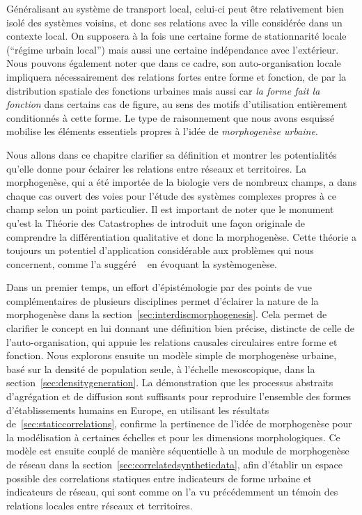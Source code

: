 Généralisant au système de transport local, celui-ci peut être relativement bien isolé des systèmes voisins, et donc ses relations avec la ville considérée dans un contexte local. On supposera à la fois une certaine forme de stationnarité locale (``régime urbain local'') mais aussi une certaine indépendance avec l'extérieur. Nous pouvons également noter que dans ce cadre, son auto-organisation locale impliquera nécessairement des relations fortes entre forme et fonction, de par la distribution spatiale des fonctions urbaines mais aussi car \emph{la forme fait la fonction} dans certains cas de figure, au sens des motifs d'utilisation entièrement conditionnés à cette forme. Le type de raisonnement que nous avons esquissé mobilise les éléments essentiels propres à l'idée de \emph{morphogenèse urbaine}.


Nous allons dans ce chapitre clarifier sa définition et montrer les potentialités qu'elle donne pour éclairer les relations entre réseaux et territoires. La morphogenèse, qui a été importée de la biologie vers de nombreux champs, a dans chaque cas ouvert des voies pour l'étude des systèmes complexes propres à ce champ selon un point particulier. Il est important de noter que le monument qu'est la Théorie des Catastrophes de  introduit une façon originale de comprendre la différentiation qualitative et donc la morphogenèse. Cette théorie a toujours un potentiel d'application considérable aux problèmes qui nous concernent, comme l'a suggéré ~\cite{durand2003geographes} en évoquant la systèmogenèse.

Dans un premier temps, un effort d'épistémologie par des points de vue complémentaires de plusieurs disciplines permet d'éclairer la nature de la morphogenèse dans la section~\ref{sec:interdiscmorphogenesis}. Cela permet de clarifier le concept en lui donnant une définition bien précise, distincte de celle de l'auto-organisation, qui appuie les relations causales circulaires entre forme et fonction. Nous explorons ensuite un modèle simple de morphogenèse urbaine, basé sur la densité de population seule, à l'échelle mesoscopique, dans la section~\ref{sec:densitygeneration}. La démonstration que les processus abstraits d'agrégation et de diffusion sont suffisants pour reproduire l'ensemble des formes d'établissements humains en Europe, en utilisant les résultats de~\ref{sec:staticcorrelations}, confirme la pertinence de l'idée de morphogenèse pour la modélisation à certaines échelles et pour les dimensions morphologiques. Ce modèle est ensuite couplé de manière séquentielle à un module de morphogenèse de réseau dans la section~\ref{sec:correlatedsyntheticdata}, afin d'établir un espace possible des correlations statiques entre indicateurs de forme urbaine et indicateurs de réseau, qui sont comme on l'a vu précédemment un témoin des relations locales entre réseaux et territoires.



